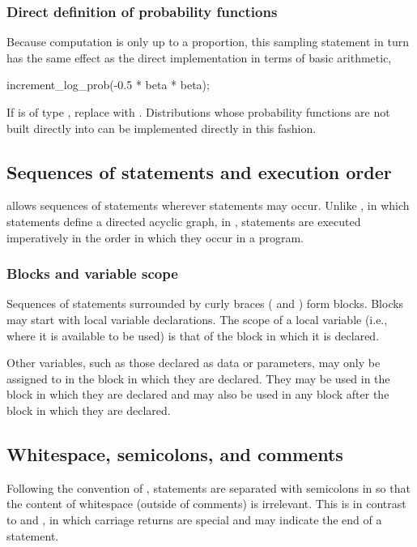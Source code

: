 \documentclass[article]{jss}
\begin{document}
\subsubsection{Direct definition of probability functions}

Because computation is only up to a proportion, this sampling
statement in turn has the same effect as the direct implementation in
terms of basic arithmetic,
%
\begin{Code}
increment_log_prob(-0.5 * beta * beta);
\end{Code}
%
If  is of type , replace 
with .  Distributions whose probability functions
are not built directly into  can be implemented
directly in this fashion.



\subsection{Sequences of statements and execution order}

 allows sequences of statements wherever statements may
occur. Unlike , in which statements define a directed
acyclic graph, in , statements are executed
imperatively in the order in which they occur in a program.

\subsubsection{Blocks and variable scope}

Sequences of statements surrounded by curly braces (\code{\{} and
\code{\}}) form blocks.  Blocks may start with local variable
declarations.  The scope of a local variable (i.e., where it is
available to be used) is that of the block in which it is declared.

Other variables, such as those declared as data or parameters, may
only be assigned to in the block in which they are declared.  They may
be used in the block in which they are declared and may also be used
in any block after the block in which they are declared.


\subsection{Whitespace, semicolons, and comments}

Following the convention of , statements are separated
with semicolons in  so that the content of whitespace
(outside of comments) is irrelevant.  This is in contrast to
 and , in which carriage returns are
special and may indicate the end of a statement.
\end{document}
